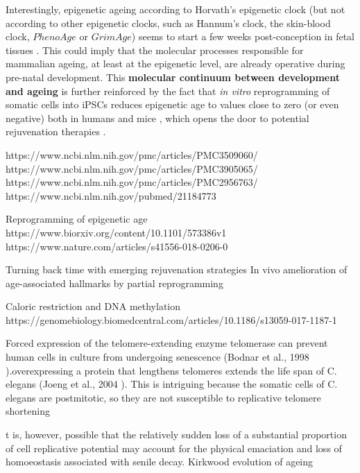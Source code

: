 Interestingly, epigenetic ageing according to Horvath's epigenetic clock (but not according to other epigenetic clocks, such as Hannum's clock, the skin-blood clock, $PhenoAge$ or $GrimAge$) seems to start a few weeks post-conception in fetal tissues \cite{Hoshino2019}. This could imply that the molecular processes responsible for mammalian ageing, at least at the epigenetic level, are already operative during pre-natal development. This \textbf{molecular continuum between development and ageing} is further reinforced by the fact that \textit{in vitro} reprogramming of somatic cells into \acrshort{iPSCs} reduces epigenetic age to values close to zero (or even negative) both in humans \cite{Horvath2013} and mice \cite{Petkovich2017,Meer2018}, which opens the door to potential rejuvenation therapies \cite{Rando2012,Olova2019}. 

https://www.ncbi.nlm.nih.gov/pmc/articles/PMC3509060/
https://www.ncbi.nlm.nih.gov/pmc/articles/PMC3905065/
https://www.ncbi.nlm.nih.gov/pmc/articles/PMC2956763/
https://www.ncbi.nlm.nih.gov/pubmed/21184773

Reprogramming of epigenetic age
https://www.biorxiv.org/content/10.1101/573386v1
https://www.nature.com/articles/s41556-018-0206-0


Turning back time with emerging rejuvenation strategies
In vivo amelioration of age-associated hallmarks by partial reprogramming

Caloric restriction and DNA methylation https://genomebiology.biomedcentral.com/articles/10.1186/s13059-017-1187-1


Forced expression of the telomere-extending enzyme telomerase can prevent human cells in culture from undergoing senescence (Bodnar et al., 1998
).overexpressing a protein that lengthens telomeres extends the life span of C. elegans (Joeng et al., 2004
). This is intriguing because the somatic cells of C. elegans are postmitotic, so they are not susceptible to replicative telomere shortening

t is, however, possible that the relatively sudden loss of a substantial proportion of cell replicative potential may account for the physical emaciation and loss of homoeostasis associated with senile decay. Kirkwood evolution of ageing


